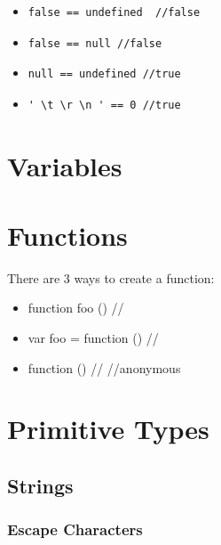 \documentclass {article}
\begin{document}
		\begin{itemize}
			\item \begin{lstlisting} 
false == undefined 	//false
				\end{lstlisting} 

			\item \begin{lstlisting} 
false == null //false
				\end{lstlisting} 

			\item \begin{lstlisting} 
null == undefined //true
				\end{lstlisting} 

			\item \begin{lstlisting} 
' \t \r \n ' == 0 //true
				\end{lstlisting} 

		\end{itemize}

\section{Variables}

\section{Functions}
	There are 3 ways to create a function: 
	\begin{itemize}
		\item function foo () /{/}
		\item var foo = function () /{/}
		\item function () /{/} //anonymous
	\end{itemize}


\section{Primitive Types}
	\subsection{Strings}
			\subsubsection{Escape Characters}
\end{document}
